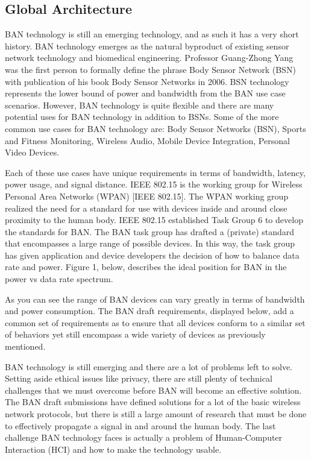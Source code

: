 \subsection{Global Architecture}
BAN technology is still an emerging technology, and as such it has a very short history. BAN technology emerges as the natural byproduct of existing sensor network technology and biomedical engineering. Professor Guang-Zhong Yang was the first person to formally define the phrase Body Sensor Network (BSN) with publication of his book Body Sensor Networks in 2006. BSN technology represents the lower bound of power and bandwidth from the BAN use case scenarios. However, BAN technology is quite flexible and there are many potential uses for BAN technology in addition to BSNs. Some of the more common use cases for BAN technology are: Body Sensor Networks (BSN), Sports and Fitness Monitoring, Wireless Audio, Mobile Device Integration, Personal Video Devices.

Each of these use cases have unique requirements in terms of bandwidth, latency, power usage, and signal distance. IEEE 802.15 is the working group for Wireless Personal Area Networks (WPAN) [IEEE 802.15]. The WPAN working group realized the need for a standard for use with devices inside and around close proximity to the human body. IEEE 802.15 established Task Group 6 to develop the standards for BAN. The BAN task group has drafted a (private) standard that encompasses a large range of possible devices. In this way, the task group has given application and device developers the decision of how to balance data rate and power. Figure 1, below, describes the ideal position for BAN in the power vs data rate spectrum.

As you can see the range of BAN devices can vary greatly in terms of bandwidth and power consumption. The BAN draft requirements, displayed below, add a common set of requirements as to ensure that all devices conform to a similar set of behaviors yet still encompass a wide variety of devices as previously mentioned.

BAN technology is still emerging and there are a lot of problems left to solve. Setting aside ethical issues like privacy, there are still plenty of technical challenges that we must overcome before BAN will become an effective solution. The BAN draft submissions have defined solutions for a lot of the basic wireless network protocols, but there is still a large amount of research that must be done to effectively propagate a signal in and around the human body. The last challenge BAN technology faces is actually a problem of Human-Computer Interaction (HCI) and how to make the technology usable.


